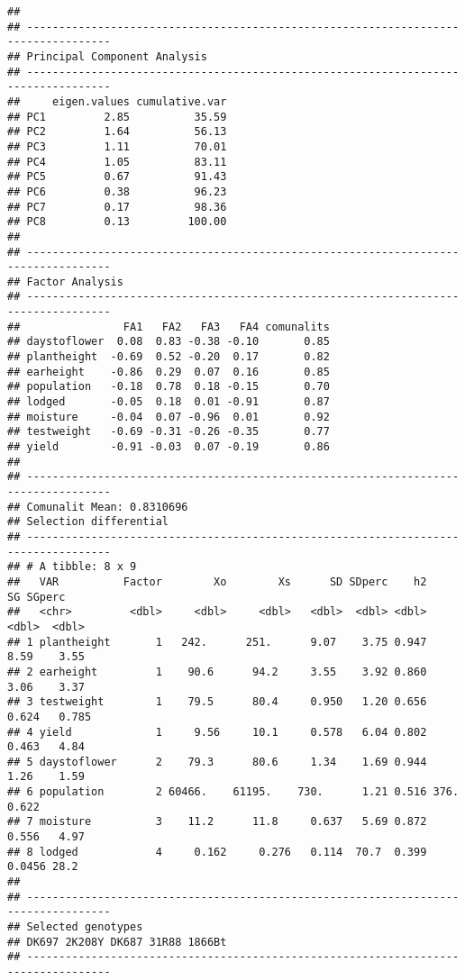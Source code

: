 \documentclass[
]{article}
\begin{document}
\begin{verbatim}
## 
## -----------------------------------------------------------------------------------
## Principal Component Analysis
## -----------------------------------------------------------------------------------
##     eigen.values cumulative.var
## PC1         2.85          35.59
## PC2         1.64          56.13
## PC3         1.11          70.01
## PC4         1.05          83.11
## PC5         0.67          91.43
## PC6         0.38          96.23
## PC7         0.17          98.36
## PC8         0.13         100.00
## 
## -----------------------------------------------------------------------------------
## Factor Analysis
## -----------------------------------------------------------------------------------
##                FA1   FA2   FA3   FA4 comunalits
## daystoflower  0.08  0.83 -0.38 -0.10       0.85
## plantheight  -0.69  0.52 -0.20  0.17       0.82
## earheight    -0.86  0.29  0.07  0.16       0.85
## population   -0.18  0.78  0.18 -0.15       0.70
## lodged       -0.05  0.18  0.01 -0.91       0.87
## moisture     -0.04  0.07 -0.96  0.01       0.92
## testweight   -0.69 -0.31 -0.26 -0.35       0.77
## yield        -0.91 -0.03  0.07 -0.19       0.86
## 
## -----------------------------------------------------------------------------------
## Comunalit Mean: 0.8310696 
## Selection differential
## -----------------------------------------------------------------------------------
## # A tibble: 8 x 9
##   VAR          Factor        Xo        Xs      SD SDperc    h2       SG SGperc
##   <chr>         <dbl>     <dbl>     <dbl>   <dbl>  <dbl> <dbl>    <dbl>  <dbl>
## 1 plantheight       1   242.      251.      9.07    3.75 0.947   8.59    3.55 
## 2 earheight         1    90.6      94.2     3.55    3.92 0.860   3.06    3.37 
## 3 testweight        1    79.5      80.4     0.950   1.20 0.656   0.624   0.785
## 4 yield             1     9.56     10.1     0.578   6.04 0.802   0.463   4.84 
## 5 daystoflower      2    79.3      80.6     1.34    1.69 0.944   1.26    1.59 
## 6 population        2 60466.    61195.    730.      1.21 0.516 376.      0.622
## 7 moisture          3    11.2      11.8     0.637   5.69 0.872   0.556   4.97 
## 8 lodged            4     0.162     0.276   0.114  70.7  0.399   0.0456 28.2  
## 
## -----------------------------------------------------------------------------------
## Selected genotypes
## DK697 2K208Y DK687 31R88 1866Bt
## -----------------------------------------------------------------------------------
\end{verbatim}
\end{document}
